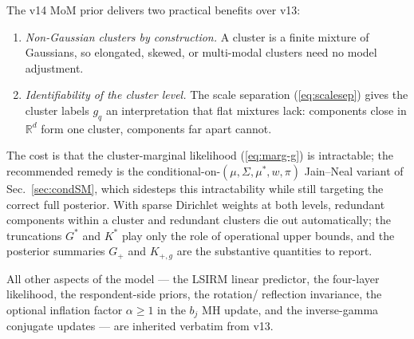 \documentclass[11pt]{article}
\newcommand{\R}{\mathbb{R}}
\begin{document}
The v14 MoM prior delivers two practical benefits over v13:
\begin{enumerate}[label=(\roman*)]
\item \emph{Non-Gaussian clusters by construction.} A cluster is a
   finite mixture of Gaussians, so elongated, skewed, or multi-modal
   clusters need no model adjustment.
\item \emph{Identifiability of the cluster level.} The scale separation
   (\ref{eq:scalesep}) gives the cluster labels $g_q$ an interpretation
   that flat mixtures lack: components close in $\R^d$ form one cluster,
   components far apart cannot.
\end{enumerate}
The cost is that the cluster-marginal likelihood (\ref{eq:marg-g}) is
intractable; the recommended remedy is the conditional-on-$(\mu,\Sigma,
\mu^*,w,\pi)$ Jain--Neal variant of Sec.~\ref{sec:condSM}, which
sidesteps this intractability while still targeting the correct full
posterior. With sparse Dirichlet weights at both levels, redundant
components within a cluster and redundant clusters die out automatically;
the truncations $G^*$ and $K^*$ play only the role of operational upper
bounds, and the posterior summaries $G_+$ and $K_{+,g}$ are the
substantive quantities to report.

All other aspects of the model --- the LSIRM linear predictor,
the four-layer likelihood, the respondent-side priors, the rotation/
reflection invariance, the optional inflation factor $\alpha\ge 1$ in
the $b_j$ MH update, and the inverse-gamma conjugate updates --- are
inherited verbatim from v13.
\end{document}
